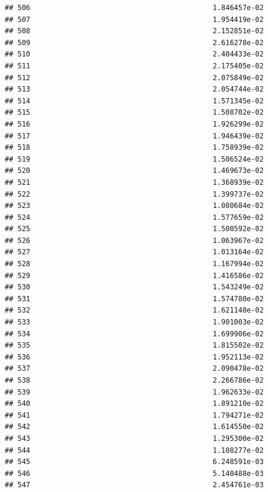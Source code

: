 \documentclass[
]{article}
\begin{document}
\begin{verbatim}
## 506                                           1.846457e-02
## 507                                           1.954419e-02
## 508                                           2.152851e-02
## 509                                           2.616278e-02
## 510                                           2.404433e-02
## 511                                           2.175405e-02
## 512                                           2.075849e-02
## 513                                           2.054744e-02
## 514                                           1.571345e-02
## 515                                           1.508702e-02
## 516                                           1.926299e-02
## 517                                           1.946439e-02
## 518                                           1.758939e-02
## 519                                           1.506524e-02
## 520                                           1.469673e-02
## 521                                           1.368939e-02
## 522                                           1.399737e-02
## 523                                           1.080684e-02
## 524                                           1.577659e-02
## 525                                           1.500592e-02
## 526                                           1.063967e-02
## 527                                           1.013164e-02
## 528                                           1.167994e-02
## 529                                           1.416586e-02
## 530                                           1.543249e-02
## 531                                           1.574780e-02
## 532                                           1.621148e-02
## 533                                           1.901003e-02
## 534                                           1.699906e-02
## 535                                           1.815502e-02
## 536                                           1.952113e-02
## 537                                           2.090478e-02
## 538                                           2.266786e-02
## 539                                           1.962633e-02
## 540                                           1.891210e-02
## 541                                           1.794271e-02
## 542                                           1.614550e-02
## 543                                           1.295300e-02
## 544                                           1.108277e-02
## 545                                           6.248591e-03
## 546                                           5.140488e-03
## 547                                           2.454761e-03

\end{verbatim}
\end{document}

